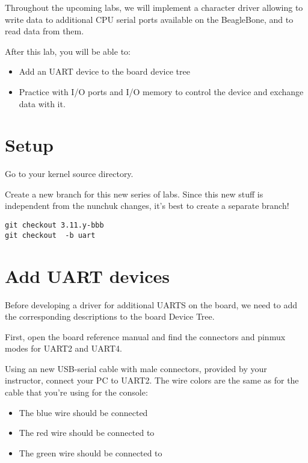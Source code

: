 
Throughout the upcoming labs, we will implement a character driver
allowing to write data to additional CPU serial ports available on 
the BeagleBone, and to read data from them.

After this lab, you will be able to:

\begin{itemize}
\item Add an UART device to the board device tree
\item Practice with I/O ports and I/O memory to control the device and
  exchange data with it.
\end{itemize}

\section{Setup}

Go to your kernel source directory.

Create a new branch for this new series of labs. Since this new stuff
is independent from the nunchuk changes, it's best to create a separate
branch!

\begin{verbatim}
git checkout 3.11.y-bbb
git checkout  -b uart
\end{verbatim}

\section{Add UART devices}

Before developing a driver for additional UARTS on the board, we
need to add the corresponding descriptions to the board Device Tree.

First, open the board reference manual and find the connectors
and pinmux modes for UART2 and UART4.

Using an new USB-serial cable with male connectors, provided by your
instructor, connect your PC to UART2. The wire colors are the same
as for the cable that you're using for the console:

\begin{itemize}
\item The blue wire should be connected  
\item The red wire should be connected to 
\item The green wire should be connected to 
\end{itemize}

